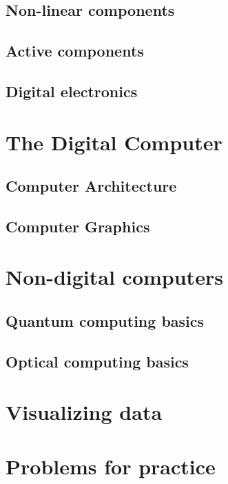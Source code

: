 \documentclass{article}
\begin{document}
\subsection{Non-linear components}

\subsection{Active components}

\subsection{Digital electronics}

\section{The Digital Computer} 

\subsection{Computer Architecture}

\subsection{Computer Graphics}

\section{Non-digital computers}

\subsection{Quantum computing basics}

\subsection{Optical computing basics}

\section{Visualizing data}

\newpage

\section*{Problems for practice}
\end{document}
